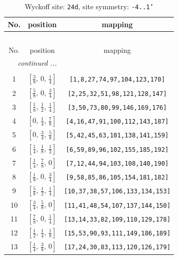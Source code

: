 \documentclass[fleqn,8pt]{jsarticle}
\begin{document}
\begin{longtable}{ccc}
\caption{Wyckoff site: {\tt 24d}, site symmetry: {\tt -4..1'}}
 \\
 \hline \hline
No. & position & mapping \\ \hline \endfirsthead

\multicolumn{2}{l}{\tablename\ \thetable{}} \\
 \hline \hline
No. & position & mapping \\ \hline \endhead

 \hline \hline
\multicolumn{2}{r}{\footnotesize\it continued ...} \\ \endfoot

 \hline \hline
\multicolumn{2}{r}{} \\ \endlastfoot

1 & $\left[ \frac{3}{8},\, 0,\, \frac{1}{4} \right]$ & {\tt [1,8,27,74,97,104,123,170]} \\ \hline
2 & $\left[ \frac{5}{8},\, 0,\, \frac{3}{4} \right]$ & {\tt [2,25,32,51,98,121,128,147]} \\ \hline
3 & $\left[ \frac{1}{8},\, \frac{1}{2},\, \frac{1}{4} \right]$ & {\tt [3,50,73,80,99,146,169,176]} \\ \hline
4 & $\left[ 0,\, \frac{1}{4},\, \frac{7}{8} \right]$ & {\tt [4,16,47,91,100,112,143,187]} \\ \hline
5 & $\left[ 0,\, \frac{3}{4},\, \frac{5}{8} \right]$ & {\tt [5,42,45,63,101,138,141,159]} \\ \hline
6 & $\left[ \frac{1}{4},\, \frac{1}{8},\, \frac{1}{2} \right]$ & {\tt [6,59,89,96,102,155,185,192]} \\ \hline
7 & $\left[ \frac{1}{4},\, \frac{7}{8},\, 0 \right]$ & {\tt [7,12,44,94,103,108,140,190]} \\ \hline
8 & $\left[ \frac{1}{8},\, 0,\, \frac{3}{4} \right]$ & {\tt [9,58,85,86,105,154,181,182]} \\ \hline
9 & $\left[ \frac{5}{8},\, \frac{1}{2},\, \frac{1}{4} \right]$ & {\tt [10,37,38,57,106,133,134,153]} \\ \hline
10 & $\left[ \frac{3}{4},\, \frac{5}{8},\, 0 \right]$ & {\tt [11,41,48,54,107,137,144,150]} \\ \hline
11 & $\left[ \frac{7}{8},\, 0,\, \frac{1}{4} \right]$ & {\tt [13,14,33,82,109,110,129,178]} \\ \hline
12 & $\left[ \frac{1}{2},\, \frac{1}{4},\, \frac{1}{8} \right]$ & {\tt [15,53,90,93,111,149,186,189]} \\ \hline
13 & $\left[ \frac{1}{4},\, \frac{3}{8},\, 0 \right]$ & {\tt [17,24,30,83,113,120,126,179]} \\ \hline

\end{longtable}
\end{document}
